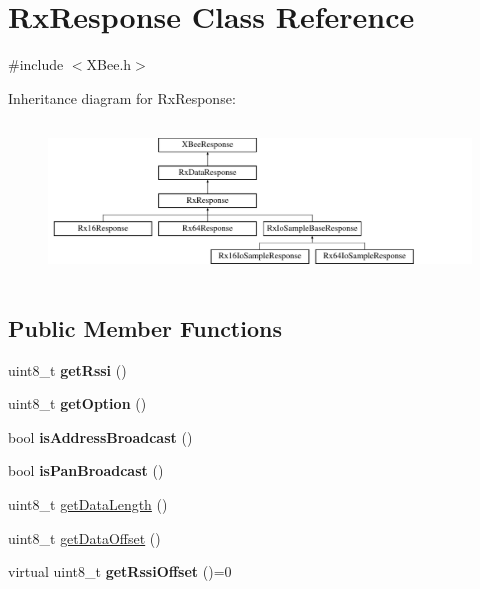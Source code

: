 \hypertarget{classRxResponse}{\section{\-Rx\-Response \-Class \-Reference}
\label{classRxResponse}
}


{\ttfamily \#include $<$\-X\-Bee.\-h$>$}

\-Inheritance diagram for \-Rx\-Response\-:\begin{figure}[H]
\begin{center}
\leavevmode
\includegraphics[height=4.166667cm]{classRxResponse}
\end{center}
\end{figure}
\subsection*{\-Public \-Member \-Functions}
\begin{DoxyCompactItemize}
\item 
\hypertarget{classRxResponse_a43fa3b1d0f4df2491496d10d7981799e}{uint8\-\_\-t {\bfseries get\-Rssi} ()}\label{classRxResponse_a43fa3b1d0f4df2491496d10d7981799e}

\item 
\hypertarget{classRxResponse_a1bd75535804b6c1ff64a9ecd8aba6fcd}{uint8\-\_\-t {\bfseries get\-Option} ()}\label{classRxResponse_a1bd75535804b6c1ff64a9ecd8aba6fcd}

\item 
\hypertarget{classRxResponse_ac85e73bfa6656b2c96275101e6fdea6e}{bool {\bfseries is\-Address\-Broadcast} ()}\label{classRxResponse_ac85e73bfa6656b2c96275101e6fdea6e}

\item 
\hypertarget{classRxResponse_a1b492ad1ff869b00903efc4ff571a006}{bool {\bfseries is\-Pan\-Broadcast} ()}\label{classRxResponse_a1b492ad1ff869b00903efc4ff571a006}

\item 
uint8\-\_\-t \hyperlink{classRxResponse_add3478a1ce5667aad315f6a6c218011a}{get\-Data\-Length} ()
\item 
uint8\-\_\-t \hyperlink{classRxResponse_a37fd3ee455f2157fa3894e710e668409}{get\-Data\-Offset} ()
\item 
\hypertarget{classRxResponse_ac0e5dc8fc16aa3004b5c59a8a306e00e}{virtual uint8\-\_\-t {\bfseries get\-Rssi\-Offset} ()=0}\label{classRxResponse_ac0e5dc8fc16aa3004b5c59a8a306e00e}

\end{DoxyCompactItemize}


